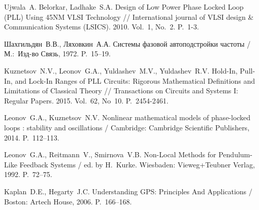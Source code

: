 \documentclass[a4paper,article,14pt]{extarticle}
\begin{document}
\begin{thebibliography}{20}
Ujwala~A. Belorkar, Ladhake~S.\:A. Design of Low Power Phase Locked Loop (PLL) Using 45NM VLSI Technology // International journal of VLSI design \& Communication Systems  (LSICS). 2010. Vol.~1, No.~2. P.~1-3.

  Шахгильдян~В.\:В., Ляховкин~А.\:А. Системы фазовой автоподстройки частоты / М.:~Изд-во Связь, 1972. P.~15--19.

 Kuznetsov~N.\:V., Leonov~G.\:A., Yuldashev~M.\:V., Yuldashev~R.\:V. Hold-In, Pull-In, and Lock-In Ranges of PLL Circuits: Rigorous Mathematical Definitions and Limitations of Classical Theory // Transactions on Circuits and Systems I: Regular Papers. 2015. Vol.~62, No~10. P.~2454-2461.
 
  Leonov~G.\:A., Kuznetsov~N.\:V. Nonlinear mathematical models of phase-locked loops : stability and oscillations / Cambridge: Cambridge Scientific Publishers, 2014. P.~112--113.

  Leonov~G.\:A., Reitmann~V., Smirnova~V.\:B. Non-Local Methods for Pendulum-Like Feedback Systems / ed. by H.~Kurke. Wiesbaden: Vieweg+Teubner Verlag, 1992. P.~72--75.

 Kaplan~D.\:E., Hegarty~J.\:C. Understanding GPS: Principles And Applications / Boston: Artech House, 2006. P.~166--168.

\end{thebibliography}
\end{document}

